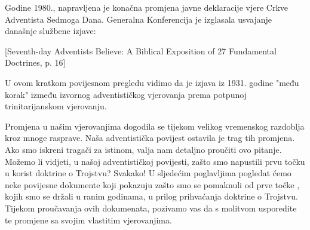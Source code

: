 Godine 1980., napravljena je konačna promjena javne deklaracije vjere Crkve Adventista Sedmoga Dana. Generalna Konferencija je izglasala usvajanje današnje službene izjave:

[Seventh-day Adventists Believe: A Biblical Exposition of 27 Fundamental Doctrines, p. 16]

U ovom kratkom povijesnom pregledu vidimo da je izjava iz 1931. godine "među korak" između izvornog adventističkog vjerovanja prema potpunoj trinitarijanskom vjerovanju.

Promjena u našim vjerovanjima dogodila se tijekom velikog vremenskog razdoblja kroz mnoge rasprave. Naša adventistička povijest ostavila je trag tih promjena. Ako smo iskreni tragači za istinom, valja nam detaljno proučiti ovo pitanje. Možemo li vidjeti, u našoj adventističkoj povijesti, zašto smo napustili prvu točku  u korist doktrine o Trojstvu? Svakako! U sljedećim poglavljima pogledat ćemo neke povijesne dokumente koji pokazuju zašto smo se pomaknuli od prve točke , kojih smo se držali u ranim godinama, u prilog prihvaćanja doktrine o Trojstvu. Tijekom proučavanja ovih dokumenata, pozivamo vas da s molitvom usporedite te promjene sa svojim vlastitim vjerovanjima.
